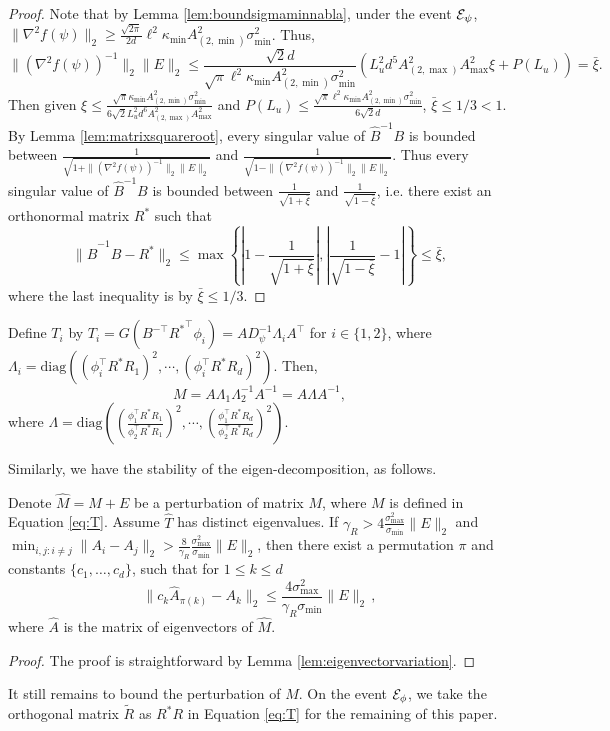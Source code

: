 \begin{proof}
Note that by Lemma \ref{lem:boundsigmaminnabla},  under the event $\mathcal{E}_{\psi}$, $\|\nabla^2f(\psi)\|_2 \ge \frac{\sqrt{2\pi}}{2d}\ell^2\kappa_{\min}A^2_{(2,\min)}\sigma_{\min}^2$. Thus,
\[
\|\left(\nabla^2f(\psi)\right)^{-1}\|_2 \|E\|_2 \le \frac{\sqrt{2}d}{\sqrt{\pi}\ell^2\kappa_{\min}A^2_{(2,\min)}\sigma_{\min}^2}\left(L_u^2d^5 A_{(2,\max)}^2A_{\max}^2\xi + P(L_u)\right) = \bar{\xi}.
\]
Then given $\xi \le \frac{\sqrt{\pi}\kappa_{\min}A^2_{(2,\min)}\sigma_{\min}^2}{6\sqrt{2}L_u^2d^6A_{(2,\max)}^2A_{\max}^2}$
and 
$P(L_u) \le \frac{\sqrt{\pi}\ell^2\kappa_{\min}A^2_{(2,\min)}\sigma_{\min}^2}{6\sqrt{2}d}$, $\bar{\xi} \le 1/3 < 1$. 
By Lemma \ref{lem:matrixsquareroot}, every singular value of $\hat{B}^{-1}B$ is bounded between $\frac{1}{\sqrt{1 + \|\left(\nabla^2f(\psi)\right)^{-1}\|_2 \|E\|_2}}$ and $\frac{1}{\sqrt{1 - \|\left(\nabla^2f(\psi)\right)^{-1}\|_2 \|E\|_2}}$. 
Thus every singular value of $\hat{B}^{-1}B$ is bounded between $\frac{1}{\sqrt{1+\bar{\xi}}}$ and $\frac{1}{\sqrt{1-\bar{\xi}}}$, i.e. there exist an orthonormal matrix $R^*$ such that 
\[
\|\hat{B}^{-1}B - R^*\|_2 \le \max \left\{ \left|1-\frac{1}{\sqrt{1+\bar{\xi}}}\right| , \left|\frac{1}{\sqrt{1-\bar{\xi}}}-1\right| \right\} \le \bar{\xi},
\]
where the last inequality is by $\bar{\xi} \le 1/3$.
\end{proof}

Define $T_i$ by $T_i = G(B^{-\top}{R^*}^{\top}\phi_i) = A D_{\psi}^{-1}\Lambda_iA^{\top}$ for $i \in \{1,2\}$,
where $\Lambda_i = \text{diag}\left((\phi_i^{\top}R^*R_1)^2, \cdots, (\phi_i^{\top}R^*R_d)^2\right)$. 
Then, 
\begin{equation}
\label{eq:T}
M = A \Lambda_1 \Lambda_2^{-1} A^{-1} = A \Lambda A^{-1},
\end{equation}
where $\Lambda = \text{diag}\left((\frac{\phi_1^{\top}R^*R_1}{\phi_2^{\top}R^*R_1})^2, \cdots, (\frac{\phi_1^{\top}R^*R_d}{\phi_2^{\top}R^*R_d})^2\right)$. 

Similarly, we have the stability of the eigen-decomposition, as follows. 
\begin{lemma}
\label{lem:Teigenvectorvariation}
Denote $\hat{M} = M+E$ be a perturbation of matrix $M$, where $M$ is defined in Equation \eqref{eq:T}. 
Assume $\hat{T}$ has distinct eigenvalues. 
If $\gamma_R > 4 \frac{\sigma_{\max}^2}{\sigma_{\min} }\|E\|_2$ and $\min_{i,j:i\neq j} \|A_i - A_j\|_2 > \frac{8}{\gamma_R}\frac{\sigma_{\max}^2}{\sigma_{\min}} \|E\|_2$, then there exist a permutation $\pi$ and constants $\{c_1,\ldots,c_d\}$, such that for $1\le k\le d$
\[
\| c_k\hat{A}_{\pi(k)} - A_k\|_2 \le \frac{4\sigma^2_{\max}}{\gamma_R\sigma_{\min}} \|E\|_2\,,
\]
where $\hat{A}$ is the matrix of eigenvectors of $\hat{M}$. 
\end{lemma}
\begin{proof}
The proof is straightforward by Lemma \ref{lem:eigenvectorvariation}.
\end{proof}
\fi
It still remains to bound the perturbation of $M$. %
On the event $\mathcal{E}_{\phi}$, we take the orthogonal matrix $\tilde{R}$ as $R^*R$ in Equation \ref{eq:T} for the remaining of this paper.

